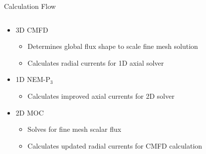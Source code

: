\begin{frame}[t]{Calculation Flow}

\begin{columns}
  \begin{column}{0.6\textwidth}
    \begin{itemize}
      \item 3D CMFD \cite{SmithCMFDOrig}
      \begin{itemize}
        \item Determines global flux shape to scale fine mesh solution
        \item Calculates radial currents for 1D axial solver
      \end{itemize}
      \item 1D NEM-P$_3$ \cite{SPnEquations,finnemann1977RodCuspingOrigMention}
      \begin{itemize}
        \item Calculates improved axial currents for 2D solver
      \end{itemize}
      \item 2D MOC \cite{AskerMOCOrig1972,HalsallMOCOrigCACTUS1980}
      \begin{itemize}
        \item Solves for fine mesh scalar flux
        \item Calculates updated radial currents for CMFD calculation
      \end{itemize}
    \end{itemize}
  \end{column}
\begin{column}{0.4\textwidth}
  \begin{figure}[h]
    \centering
    \resizebox{!}{0.7\textheight}{}
  \end{figure}
\end{column}
\end{columns}

\end{frame}


